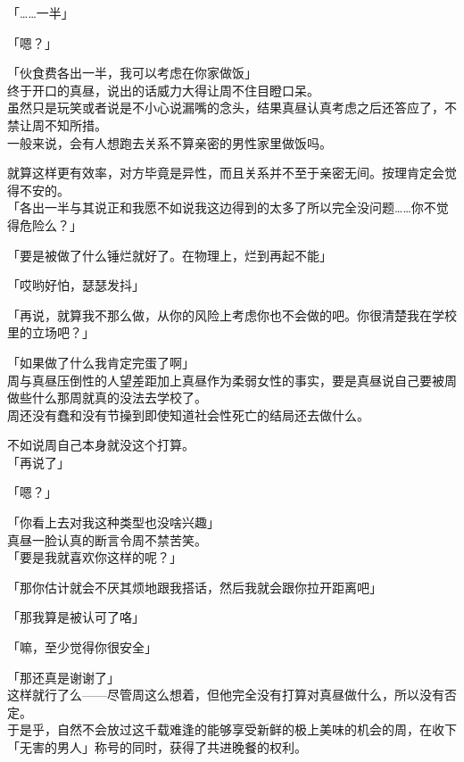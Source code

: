 「……一半」

「嗯？」

「伙食费各出一半，我可以考虑在你家做饭」\\

终于开口的真昼，说出的话威力大得让周不住目瞪口呆。\\

虽然只是玩笑或者说是不小心说漏嘴的念头，结果真昼认真考虑之后还答应了，不禁让周不知所措。\\

一般来说，会有人想跑去关系不算亲密的男性家里做饭吗。

就算这样更有效率，对方毕竟是异性，而且关系并不至于亲密无间。按理肯定会觉得不安的。\\

「各出一半与其说正和我愿不如说我这边得到的太多了所以完全没问题……你不觉得危险么？」

「要是被做了什么锤烂就好了。在物理上，烂到再起不能」

「哎哟好怕，瑟瑟发抖」

「再说，就算我不那么做，从你的风险上考虑你也不会做的吧。你很清楚我在学校里的立场吧？」

「如果做了什么我肯定完蛋了啊」\\

周与真昼压倒性的人望差距加上真昼作为柔弱女性的事实，要是真昼说自己要被周做些什么那周就真的没法去学校了。\\

周还没有蠢和没有节操到即使知道社会性死亡的结局还去做什么。

不如说周自己本身就没这个打算。\\

「再说了」

「嗯？」

「你看上去对我这种类型也没啥兴趣」\\

真昼一脸认真的断言令周不禁苦笑。\\

「要是我就喜欢你这样的呢？」

「那你估计就会不厌其烦地跟我搭话，然后我就会跟你拉开距离吧」

「那我算是被认可了咯」

「嘛，至少觉得你很安全」

「那还真是谢谢了」\\

这样就行了么——尽管周这么想着，但他完全没有打算对真昼做什么，所以没有否定。\\

于是乎，自然不会放过这千载难逢的能够享受新鲜的极上美味的机会的周，在收下「无害的男人」称号的同时，获得了共进晚餐的权利。
